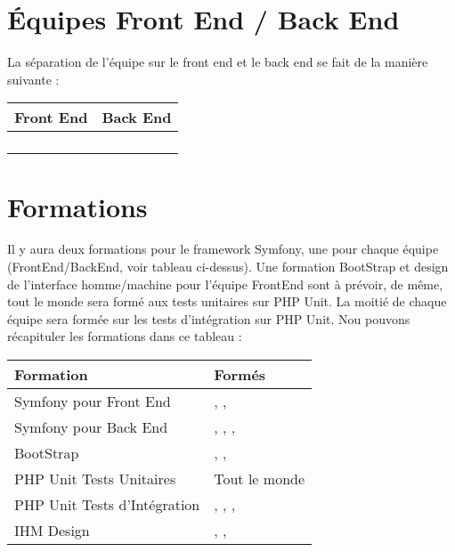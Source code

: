 \documentclass [a4paper] {article}
\begin{document}
\section{Équipes Front End / Back End}
La séparation de l'équipe sur le front end et le back end se fait de la manière suivante : \\
	\begin{tabular}{| p{5cm} | p{5cm} |}
		\hline
		\rowcolor{Gray}
		Front End & Back End		 \\
		\hline
		\Matthieu & \Florian \\
		\Mathieu & \Kafui \\
		\Julie & \Michel \\
		 & \Melissa \\
		\hline
	\end{tabular}


\section{Formations}
Il y aura deux formations pour le framework Symfony, une pour chaque équipe (FrontEnd/BackEnd, voir tableau ci-dessus). Une formation BootStrap et design de l'interface homme/machine pour l'équipe FrontEnd sont à prévoir, de même, tout le monde sera formé aux tests unitaires sur PHP Unit. La moitié de chaque équipe sera formée sur les tests d'intégration sur PHP Unit. Nou pouvons récapituler les formations dans ce tableau : \\
\begin{tabular}{| p{5cm} | p{5cm} |}
		\hline
		\rowcolor{Gray}
		Formation & Formés		 \\
		\hline
		Symfony pour Front End & \Matthieu, \Mathieu, \Julie \\ \hline
		Symfony pour Back End & \Kafui, \Florian, \Michel, \Melissa \\ \hline
		BootStrap & \Matthieu, \Mathieu, \Julie \\ \hline
		PHP Unit Tests Unitaires & Tout le monde \\ \hline
		PHP Unit Tests d'Intégration & \Michel, \Florian, \Kafui, \Matthieu \\ \hline
		IHM Design & \Matthieu, \Mathieu, \Julie \\ \hline
	\end{tabular}
\end{document}
